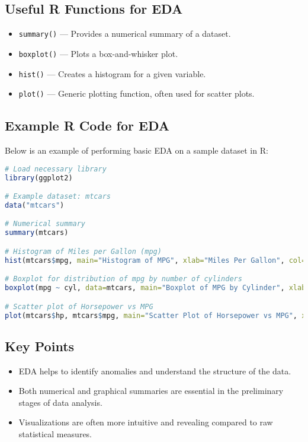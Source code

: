 \subsection{Useful R Functions for EDA}
\begin{itemize}
    \item \texttt{summary()} --- Provides a numerical summary of a dataset.
    \item \texttt{boxplot()} --- Plots a box-and-whisker plot.
    \item \texttt{hist()} --- Creates a histogram for a given variable.
    \item \texttt{plot()} --- Generic plotting function, often used for scatter plots.
\end{itemize}

\subsection{Example R Code for EDA}
Below is an example of performing basic EDA on a sample dataset in R:

\begin{lstlisting}[language=R, caption=Basic EDA in R]
# Load necessary library
library(ggplot2)

# Example dataset: mtcars
data("mtcars")

# Numerical summary
summary(mtcars)

# Histogram of Miles per Gallon (mpg)
hist(mtcars$mpg, main="Histogram of MPG", xlab="Miles Per Gallon", col="lightblue", breaks=10)

# Boxplot for distribution of mpg by number of cylinders
boxplot(mpg ~ cyl, data=mtcars, main="Boxplot of MPG by Cylinder", xlab="Number of Cylinders", ylab="Miles Per Gallon", col="orange")

# Scatter plot of Horsepower vs MPG
plot(mtcars$hp, mtcars$mpg, main="Scatter Plot of Horsepower vs MPG", xlab="Horsepower", ylab="Miles Per Gallon", col="blue", pch=19)
\end{lstlisting}

\subsection{Key Points}
\begin{itemize}
    \item EDA helps to identify anomalies and understand the structure of the data.
    \item Both numerical and graphical summaries are essential in the preliminary stages of data analysis.
    \item Visualizations are often more intuitive and revealing compared to raw statistical measures.
\end{itemize}
